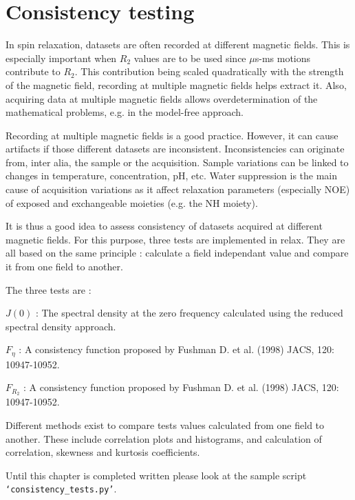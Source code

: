 
\chapter{Consistency testing}



In spin relaxation, datasets are often recorded at different magnetic fields. This is especially important when $R_2$ values are to be used since $\mu$s-ms motions contribute to $R_2$. This contribution being scaled quadratically with the strength of the magnetic field, recording at multiple magnetic fields helps extract it. Also, acquiring data at multiple magnetic fields allows overdetermination of the mathematical problems, e.g. in the model-free approach.

Recording at multiple magnetic fields is a good practice. However, it can cause artifacts if those different datasets are inconsistent. Inconsistencies can originate from, inter alia, the sample or the acquisition. Sample variations can be linked to changes in temperature, concentration, pH, etc. Water suppression is the main cause of acquisition variations as it affect relaxation parameters (especially NOE) of exposed and exchangeable moieties (e.g. the NH moiety).

It is thus a good idea to assess consistency of datasets acquired at different magnetic fields. For this purpose, three tests are implemented in relax. They are all based on the same principle : calculate a field independant value and compare it from one field to another.

The three tests are :

$J(0)$ : The spectral density at the zero frequency calculated using the reduced spectral density approach.

$F_\eta$ : A consistency function proposed by Fushman D. et al. (1998) JACS, 120: 10947-10952.

$F_{R_2}$ : A consistency function proposed by Fushman D. et al. (1998) JACS, 120: 10947-10952.

Different methods exist to compare tests values calculated from one field to another. These include correlation plots and histograms, and calculation of correlation, skewness and kurtosis coefficients.



Until this chapter is completed written please look at the sample script \texttt{`consistency\_tests.py'}.
